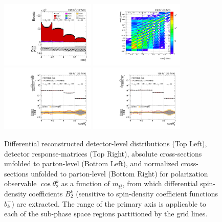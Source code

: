 \clearpage
\begin{figure}[htb]
\begin{center}
 \includegraphics[width=0.40\textwidth]{fig_fullRun2UL/controlplots/combined/Hyp_LeptonBk_vs_TTBarMass.pdf}
 \includegraphics[width=0.40\textwidth]{fig_fullRun2UL/unfolding/combined/ResponseMatrix_b2k_mttbar.pdf} \\
 \includegraphics[width=0.40\textwidth]{fig_fullRun2UL/unfolding/combined/UnfoldedResults_b2k_mttbar.pdf}
 \includegraphics[width=0.40\textwidth]{fig_fullRun2UL/unfolding/combined/UnfoldedResultsNorm_b2k_mttbar.pdf} \\
\label{fig:b2k_mttbar}
\caption{Differential reconstructed detector-level distributions (Top Left), detector response-matrices (Top Right), absolute cross-sections unfolded to parton-level (Bottom Left), and normalized cross-sections unfolded to parton-level (Bottom Right) for polarization observable $\cos\theta_{2}^{k}$ as a function of $m_{t\bar{t}}$, from which differential spin-density coefficients $B_{2}^{k}$ (sensitive to spin-density coefficient functions $b_k^{-}$) are extracted.  The range of the primary axis is applicable to each of the sub-phase space regions partitioned by the grid lines.}
\end{center}
\end{figure}
